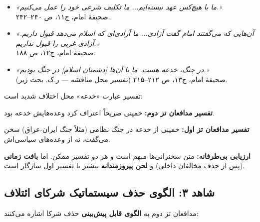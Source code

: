 \documentclass[12pt,a4paper]{book}
\newcommand{\keyword}[1]{\textbf{\textcolor{cPrimary}{#1}}}
\begin{document}
\begin{noteBox}
\begin{itemize}[label=\textcolor{cGold}{$\blacktriangleright$}, rightmargin=2em]
    \item \textit{«ما با هیچ‌کس عهد نبسته‌ایم... ما تکلیف شرعی خود را عمل می‌کنیم.»}\\
    {\footnotesize صحیفهٔ امام، ج۱۱، ص ۲۴۰–۲۴۲.}

    \item \textit{«آن‌هایی که می‌گفتند امام گفت آزادی... ما آزادی‌ای که اسلام می‌دهد قبول داریم. آزادی غربی را قبول نداریم.»}\\
    {\footnotesize صحیفهٔ امام، ج۱۲، ص ۱۸۸.}

    \item \textit{«در جنگ، خدعه هست. ما با آن‌ها [دشمنان اسلام] در جنگ بودیم.»}\\
    {\footnotesize صحیفهٔ امام، ج۱۳، ص ۲۱۲–۲۱۵ (تفسیر محل مناقشه — ر.ک. بحث زیر).}
\end{itemize}
\end{noteBox}

\begin{warningBox}
تفسیر عبارت «خدعه» محل اختلاف شدید است:

\textbf{تفسیر مدافعان تز دوم:} خمینی صریحاً اعتراف کرد وعده‌هایش خدعه بود.

\textbf{تفسیر مدافعان تز اول:} خمینی از خدعه در جنگ نظامی (مثلاً جنگ ایران-عراق) سخن می‌گفت، نه از وعده‌های سیاسی‌اش.

\textbf{ارزیابی بی‌طرفانه:} متن سخنرانی‌ها مبهم است و هر دو تفسیر ممکن. اما \keyword{بافت زمانی} (پس از حذف مخالفان داخلی) و \keyword{لحن پیروزمندانه} بیشتر با تفسیر اول سازگار است.
\end{warningBox}

\subsection{شاهد ۳: الگوی حذف سیستماتیک شرکای ائتلاف}

مدافعان تز دوم به \keyword{الگوی قابل پیش‌بینی} حذف شرکا اشاره می‌کنند:
\end{document}
